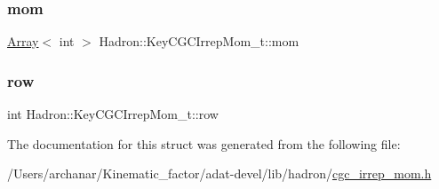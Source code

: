 \subsubsection{\texorpdfstring{mom}{mom}}
{\footnotesize\ttfamily \mbox{\hyperlink{classXMLArray_1_1Array}{Array}}$<$ int $>$ Hadron\+::\+Key\+C\+G\+C\+Irrep\+Mom\+\_\+t\+::mom}

\mbox{\label{structHadron_1_1KeyCGCIrrepMom__t_a3e57507b9b7e870a9def2e18f4507875}} 
\subsubsection{\texorpdfstring{row}{row}}
{\footnotesize\ttfamily int Hadron\+::\+Key\+C\+G\+C\+Irrep\+Mom\+\_\+t\+::row}



The documentation for this struct was generated from the following file\+:\begin{DoxyCompactItemize}
\item 
/\+Users/archanar/\+Kinematic\+\_\+factor/adat-\/devel/lib/hadron/\mbox{\hyperlink{adat-devel_2lib_2hadron_2cgc__irrep__mom_8h}{cgc\+\_\+irrep\+\_\+mom.\+h}}\end{DoxyCompactItemize}
